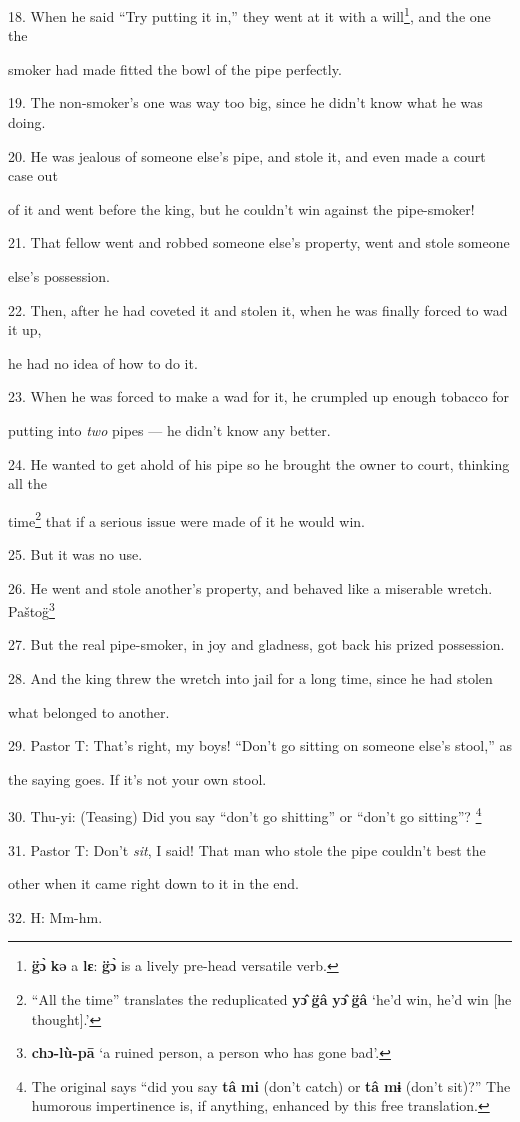 18. When he said ``Try putting it in,'' they went at it with a will\footnote{\textbf{g̈ɔ̀} \textbf{kə} a \textbf{lɛ}: \textbf{g̈ɔ̀} is a lively pre-head versatile verb.}, and the
one the

smoker had made fitted the bowl of the pipe perfectly.

19. The non-smoker's one was way too big, since he didn't know what he was doing.

20. He was jealous of someone else's pipe, and stole it, and even made a court
case out

of it and went before the king, but he couldn't win against the pipe-smoker!

21. That fellow went and robbed someone else's property, went and stole someone


else's possession.

22. Then, after he had coveted it and stolen it, when he was finally forced to
wad it up,

he had no idea of how to do it.

23. When he was forced to make a wad for it, he crumpled up enough tobacco for


putting into \textit{two} pipes --- he didn't know any better.

24. He wanted to get ahold of his pipe so he brought the owner to court, thinking
all the

time\footnote{``All the time'' translates the reduplicated \textbf{yɔ̂} \textbf{g̈â} \textbf{yɔ̂} \textbf{g̈â} `he'd win, he'd win [he thought].'} that if a serious issue were made of it he would win.

25. But it was no use.

26. He went and stole another's property, and behaved like a miserable wretch.
Paštog̈\footnote{\textbf{chɔ-lù-pā} `a ruined person, a person who has gone bad'.}

27. But the real pipe-smoker, in joy and gladness, got back his prized possession.

28. And the king threw the wretch into jail for a long time, since he had stolen


what belonged to another.

29. Pastor T: That's right, my boys! ``Don't go sitting on someone else's
stool,'' as

the saying goes. If it's not your own stool.

30. Thu-yi: (Teasing) Did you say ``don't go shitting'' or ``don't go sitting''?
\footnote{The original says ``did you say \textbf{tâ} \textbf{mi} (don't catch) or \textbf{tâ} \textbf{mɨ} (don't sit)?'' The humorous impertinence is, if anything, enhanced by this free translation.}

31. Pastor T: Don't \textit{sit}, I said! That man who stole the pipe couldn't
best the

other when it came right down to it in the end.

32. H: Mm-hm.

